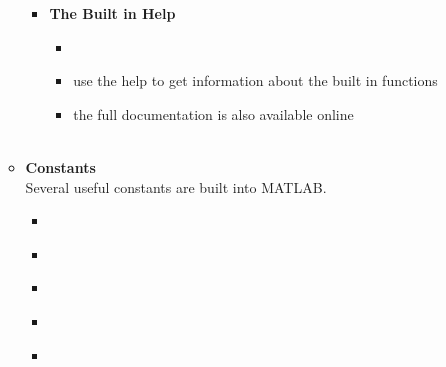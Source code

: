 \documentclass[11pt]{article}
\begin{document}
\begin{itemize}
\begin{itemize}
\begin{itemize}
				\item \textbf{\Large The Built in Help }\\	
					\begin{itemize}
						\item {} \\
						\item \LARGE{use the help to get information about the built in functions } \\
						\item \LARGE{the full documentation is also available online } \\\\
						
					\end{itemize}	
				\newpage
			\end{itemize}

	\newpage
	\item \textbf{ \LARGE Constants} \\

		 \LARGE{Several useful constants are built into MATLAB.} \\

				\begin{itemize}
					
					\item {} \\
					\item {} \\
					\item {} \\
					\item {} \\
					\item {} \\\\

				\end{itemize}



\end{itemize}
\end{itemize}
\end{document}
